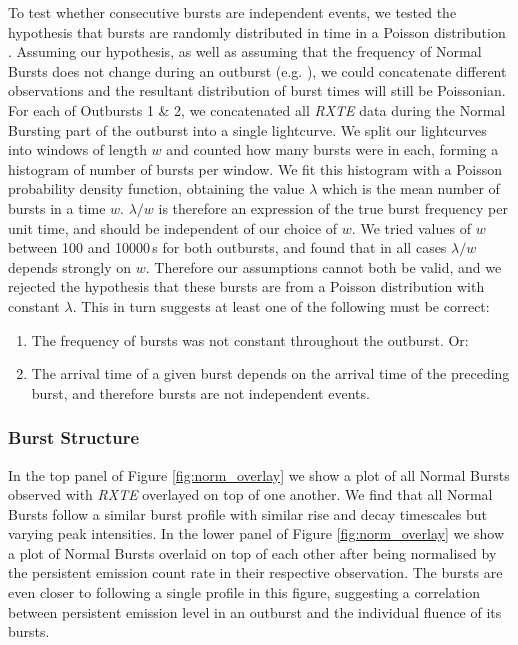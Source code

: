 \par To test whether consecutive bursts are independent events, we tested the hypothesis that bursts are randomly distributed in time in a Poisson distribution \citep{Poisson_Distribution}.  Assuming our hypothesis, as well as assuming that the frequency of Normal Bursts does not change during an outburst (e.g. \citealp{Aptekar_Recur}), we could concatenate different observations and the resultant distribution of burst times will still be Poissonian.  For each of Outbursts 1 \& 2, we concatenated all \textit{RXTE} data during the Normal Bursting part of the outburst into a single lightcurve.  We split our lightcurves into windows of length $w$ and counted how many bursts were in each, forming a histogram of number of bursts per window.  We fit this histogram with a Poisson probability density function, obtaining the value $\lambda$ which is the mean number of bursts in a time $w$.  $\lambda/w$ is therefore an expression of the true burst frequency per unit time, and should be independent of our choice of $w$.  We tried values of $w$ between 100 and 10000\,s for both outbursts, and found that in all cases $\lambda/w$ depends strongly on $w$.  Therefore our assumptions cannot both be valid, and we rejected the hypothesis that these bursts are from a Poisson distribution with constant $\lambda$.  This in turn suggests at least one of the following must be correct:
\begin{enumerate}
\item The frequency of bursts was not constant throughout the outburst.  Or:
\item The arrival time of a given burst depends on the arrival time of the preceding burst, and therefore bursts are not independent events.
\end{enumerate}

\subsubsection{Burst Structure}

\label{sec:struc}

\par In the top panel of Figure \ref{fig:norm_overlay} we show a plot of all Normal Bursts observed with \textit{RXTE} overlayed on top of one another.  We find that all Normal Bursts follow a similar burst profile with similar rise and decay timescales but varying peak intensities.  In the lower panel of Figure \ref{fig:norm_overlay} we show a plot of Normal Bursts overlaid on top of each other after being normalised by the persistent emission count rate in their respective observation.  The bursts are even closer to following a single profile in this figure, suggesting a correlation between persistent emission level in an outburst and the individual fluence of its bursts.

